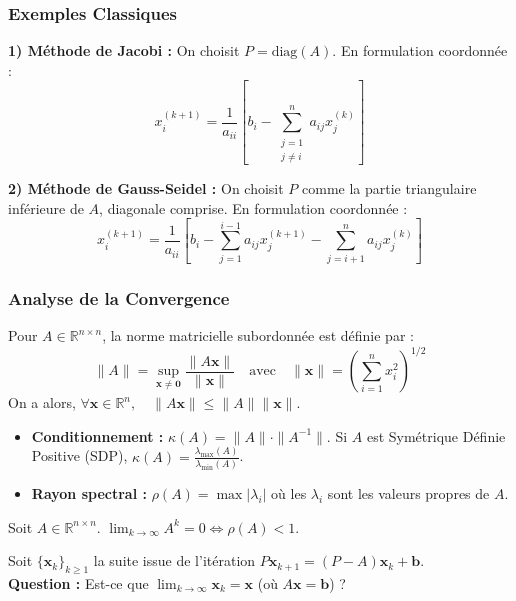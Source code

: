 \subsubsection*{Exemples Classiques}

\textbf{1) Méthode de Jacobi :}
On choisit $P = \text{diag}(A)$. En formulation coordonnée :
$$x_i^{(k+1)} = \frac{1}{a_{ii}} \left[ b_i - \sum_{\substack{j=1 \\ j \neq i}}^n a_{ij} x_j^{(k)} \right]$$

\textbf{2) Méthode de Gauss-Seidel :}
On choisit $P$ comme la partie triangulaire inférieure de $A$, diagonale comprise. En formulation coordonnée :
$$x_i^{(k+1)} = \frac{1}{a_{ii}} \left[ b_i - \sum_{j=1}^{i-1} a_{ij} x_j^{(k+1)} - \sum_{j=i+1}^n a_{ij} x_j^{(k)} \right]$$

\subsubsection*{Analyse de la Convergence}

\begin{definition}
Pour $A \in \mathbb{R}^{n \times n}$, la norme matricielle subordonnée est définie par :
$$\|A\| = \sup_{\mathbf{x} \neq \mathbf{0}} \frac{\|A\mathbf{x}\|}{\|\mathbf{x}\|} \quad \text{avec} \quad \|\mathbf{x}\| = \left( \sum_{i=1}^n x_i^2 \right)^{1/2}$$
On a alors, $\forall \mathbf{x} \in \mathbb{R}^n, \quad \|A\mathbf{x}\| \le \|A\| \|\mathbf{x}\|$.
\end{definition}

\begin{definition}
\begin{itemize}
    \item \textbf{Conditionnement :} $\kappa(A) = \|A\| \cdot \|A^{-1}\|$. Si $A$ est Symétrique Définie Positive (SDP), $\kappa(A) = \frac{\lambda_{\max}(A)}{\lambda_{\min}(A)}$.
    \item \textbf{Rayon spectral :} $\rho(A) = \max |\lambda_i|$ où les $\lambda_i$ sont les valeurs propres de $A$.
\end{itemize}
\end{definition}

\begin{theoreme}
Soit $A \in \mathbb{R}^{n \times n}$. $\lim_{k \to \infty} A^k = 0 \iff \rho(A) < 1$.
\end{theoreme}

Soit $\{\mathbf{x}_k\}_{k \ge 1}$ la suite issue de l'itération $P\mathbf{x}_{k+1} = (P-A)\mathbf{x}_k + \mathbf{b}$. \\
\textbf{Question :} Est-ce que $\lim_{k \to \infty} \mathbf{x}_k = \mathbf{x}$ (où $A\mathbf{x} = \mathbf{b}$) ?

